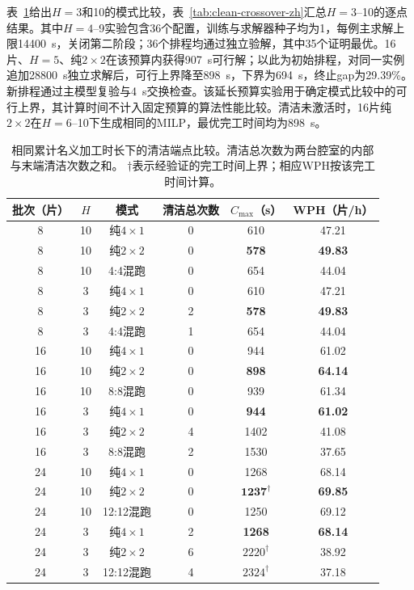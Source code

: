 \documentclass[journal]{IEEEtran}
\begin{document}
表~\ref{tab:mode-extended-zh}给出$H=3$和10的模式比较，表~\ref{tab:clean-crossover-zh}汇总$H=3$--10的逐点结果。其中$H=4$--9实验包含36个配置，训练与求解器种子均为1，每例主求解上限14400~s，关闭第二阶段；36个排程均通过独立验解，其中35个证明最优。16片、$H=5$、纯$2\times2$在该预算内获得907~s可行解；以此为初始排程，对同一实例追加28800~s独立求解后，可行上界降至898~s，下界为694~s，终止gap为29.39\%。新排程通过主模型复验与4~s交换检查。该延长预算实验用于确定模式比较中的可行上界，其计算时间不计入固定预算的算法性能比较。清洁未激活时，16片纯$2\times2$在$H=6$--10下生成相同的MILP，最优完工时间均为898~s。

\begin{table}[!htbp]
\centering
\footnotesize
\setlength{\tabcolsep}{4pt}
\caption{相同累计名义加工时长下的清洁端点比较。清洁总次数为两台腔室的内部与末端清洁次数之和。 $\dagger$表示经验证的完工时间上界；相应WPH按该完工时间计算。}
\label{tab:mode-extended-zh}
\begin{tabular}{cccccc}
\toprule
批次（片） & $H$ & 模式 & 清洁总次数 & $C_{\max}$（s） & WPH（片/h）\\
\midrule
8 & 10 & 纯$4\times1$ & 0 & 610 & 47.21\\
8 & 10 & 纯$2\times2$ & 0 & \textbf{578} & \textbf{49.83}\\
8 & 10 & 4:4混跑 & 0 & 654 & 44.04\\
8 & 3 & 纯$4\times1$ & 0 & 610 & 47.21\\
8 & 3 & 纯$2\times2$ & 2 & \textbf{578} & \textbf{49.83}\\
8 & 3 & 4:4混跑 & 1 & 654 & 44.04\\
\midrule
16 & 10 & 纯$4\times1$ & 0 & 944 & 61.02\\
16 & 10 & 纯$2\times2$ & 0 & \textbf{898} & \textbf{64.14}\\
16 & 10 & 8:8混跑 & 0 & 939 & 61.34\\
16 & 3 & 纯$4\times1$ & 0 & \textbf{944} & \textbf{61.02}\\
16 & 3 & 纯$2\times2$ & 4 & 1402 & 41.08\\
16 & 3 & 8:8混跑 & 2 & 1530 & 37.65\\
\midrule
24 & 10 & 纯$4\times1$ & 0 & 1268 & 68.14\\
24 & 10 & 纯$2\times2$ & 0 & $\mathbf{1237}^{\dagger}$ & \textbf{69.85}\\
24 & 10 & 12:12混跑 & 0 & 1250 & 69.12\\
24 & 3 & 纯$4\times1$ & 2 & \textbf{1268} & \textbf{68.14}\\
24 & 3 & 纯$2\times2$ & 6 & $2220^{\dagger}$ & 38.92\\
24 & 3 & 12:12混跑 & 4 & $2324^{\dagger}$ & 37.18\\
\bottomrule
\end{tabular}
\end{table}
\end{document}
